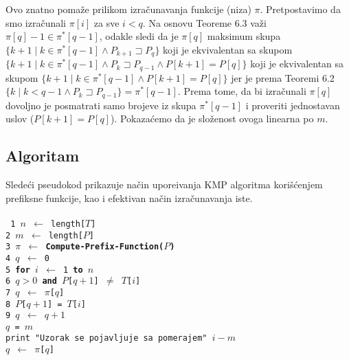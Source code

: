 \documentclass[a4paper,12pt]{article}
\newcommand{\razmak}{\vspace{0.2cm}}
\begin{document}
Ovo znatno poma\v ze prilikom izra\v cunavanja funkcije (niza) $\pi$. Pretpostavimo da smo izra\v cunali $\pi[i]$ za sve $i < q$. Na osnovu Teoreme 6.3 va\v zi $\pi[q] - 1 \in \pi^\ast[q - 1]$, odakle sledi da je $\pi[q]$ maksimum skupa $\{k + 1 \mid k \in \pi^\ast[q - 1] \wedge P_{k + 1} \sqsupset P_q \}$ koji je ekvivalentan sa skupom $\{k + 1 \mid k \in \pi^\ast[q - 1] \wedge P_k \sqsupset P_{q - 1} \wedge P[k + 1] = P[q] \}$ koji je ekvivalentan sa skupom $\{k + 1 \mid k \in \pi^\ast[q - 1] \wedge P[k + 1] = P[q] \}$ jer je prema Teoremi 6.2 $\{k \mid k < q - 1 \wedge  P_k \sqsupset P_{q-1} \} = \pi^\ast[q - 1]$. Prema tome, da bi izra\v cunali $\pi[q]$ dovoljno je posmatrati samo brojeve iz skupa $\pi^\ast[q - 1]$ i proveriti jednostavan uslov ($P[k + 1] = P[q]$). Pokaza\' cemo da je slo\v zenost ovoga linearna po $m$.

\subsection{Algoritam}

Slede\' ci pseudokod prikazuje na\v cin upore\dj ivanja KMP algoritma kori\v s\' cenjem prefiksne funkcije, kao i efektivan na\v cin izra\v cunavanja iste.
\\

 \\
\texttt{
\noindent \phantom{1}1 $n$ $\leftarrow$ length[$T$] \\
\noindent \phantom{1}2 $m$ $\leftarrow$ length[$P$] \\
\razmak
\noindent \phantom{1}3 $\pi$ $\leftarrow$ {\bf Compute-Prefix-Function($P$)} \\
\noindent \phantom{1}4 $q$ $\leftarrow$ 0 \\
\noindent \phantom{1}5 {\bf for} $i$ $\leftarrow$ 1 {\bf to} $n$\\
\noindent \phantom{1}6  $q > 0$ {\bf and} $P$[$q + 1$] $\neq$ $T$[$i$] \\
\noindent \phantom{1}7 \indent \indent \indent {} $q$ $\leftarrow$ $\pi$[$q$] \\
\noindent \phantom{1}8 \indent {} $P$[$q + 1$] = $T$[$i$] \\
\noindent \phantom{1}9 \indent \indent {} $q$ $\leftarrow$ $q + 1$ \\
 \indent {} $q$ = $m$ \\
 \indent \indent {} print "Uzorak se pojavljuje sa pomerajem" $i - m$ \\
 \indent \indent \indent \indent \indent $q$ $\leftarrow$ $\pi$[$q$] \\ }
\end{document}
